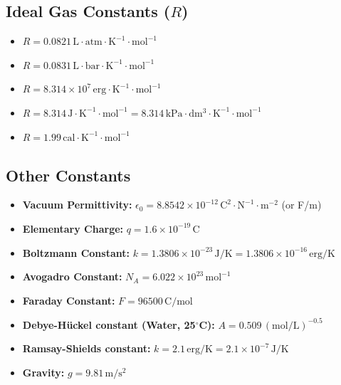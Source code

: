 \subsection{Ideal Gas Constants ($R$)}
\begin{itemize}
    \item $R = 0.0821 \, \mathrm{L \cdot atm \cdot K^{-1} \cdot mol^{-1}}$
    \item $R = 0.0831 \, \mathrm{L \cdot bar \cdot K^{-1} \cdot mol^{-1}}$
    \item $R = 8.314 \times 10^7 \, \mathrm{erg \cdot K^{-1} \cdot mol^{-1}}$
    \item $R = 8.314 \, \mathrm{J \cdot K^{-1} \cdot mol^{-1}} = 8.314 \, \mathrm{kPa \cdot dm^3 \cdot K^{-1} \cdot mol^{-1}}$
    \item $R = 1.99 \, \mathrm{cal \cdot K^{-1} \cdot mol^{-1}}$
\end{itemize}

\subsection{Other Constants}
\begin{itemize}
    \item \textbf{Vacuum Permittivity:} $\epsilon_0 = 8.8542 \times 10^{-12} \, \mathrm{C^2 \cdot N^{-1} \cdot m^{-2}}$ (or F/m)
    \item \textbf{Elementary Charge:} $q = 1.6 \times 10^{-19} \, \mathrm{C}$
    \item \textbf{Boltzmann Constant:} $k = 1.3806 \times 10^{-23} \, \mathrm{J/K} = 1.3806 \times 10^{-16} \, \mathrm{erg/K}$
    \item \textbf{Avogadro Constant:} $N_A = 6.022 \times 10^{23} \, \mathrm{mol^{-1}}$
    \item \textbf{Faraday Constant:} $F = 96500 \, \mathrm{C/mol}$
    \item \textbf{Debye-Hückel constant (Water, 25$^\circ$C):} $A = 0.509 \, (\mathrm{mol/L})^{-0.5}$
    \item \textbf{Ramsay-Shields constant:} $k = 2.1 \, \mathrm{erg/K} = 2.1 \times 10^{-7} \, \mathrm{J/K}$
    \item \textbf{Gravity:} $g = 9.81 \, \mathrm{m/s^2}$
\end{itemize}
